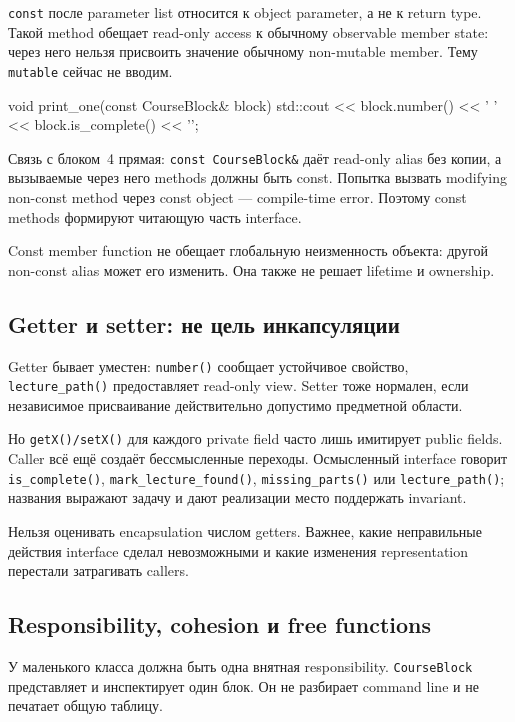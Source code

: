 \texttt{const} после parameter list относится к object parameter, а не к
return type. Такой method обещает read-only access к обычному observable
member state: через него нельзя присвоить значение обычному non-mutable
member. Тему \texttt{mutable} сейчас не вводим.

\begin{cppcode}
void print_one(const CourseBlock& block) {
    std::cout << block.number() << ' ' << block.is_complete() << '\n';
}
\end{cppcode}

Связь с блоком~4 прямая: \texttt{const CourseBlock\&} даёт read-only alias без
копии, а вызываемые через него methods должны быть const. Попытка вызвать
modifying non-const method через const object --- compile-time error. Поэтому
const methods формируют читающую часть interface.

Const member function не обещает глобальную неизменность объекта: другой
non-const alias может его изменить. Она также не решает lifetime и ownership.

\subsection{Getter и setter: не цель инкапсуляции}

Getter бывает уместен: \texttt{number()} сообщает устойчивое свойство,
\texttt{lecture\_path()} предоставляет read-only view. Setter тоже нормален,
если независимое присваивание действительно допустимо
предметной области.

Но \texttt{getX()/setX()} для каждого private field часто лишь имитирует
public fields. Caller всё ещё создаёт бессмысленные переходы. Осмысленный
interface говорит \texttt{is\_complete()},
\texttt{mark\_lecture\_found()}, \texttt{missing\_parts()} или
\texttt{lecture\_path()}; названия выражают задачу и дают реализации место
поддержать invariant.

Нельзя оценивать encapsulation числом getters. Важнее, какие неправильные
действия interface сделал невозможными и какие изменения representation
перестали затрагивать callers.

\subsection{Responsibility, cohesion и free functions}

У маленького класса должна быть одна внятная responsibility.
\texttt{CourseBlock} представляет и инспектирует один блок. Он не разбирает
command line и не печатает общую таблицу.

